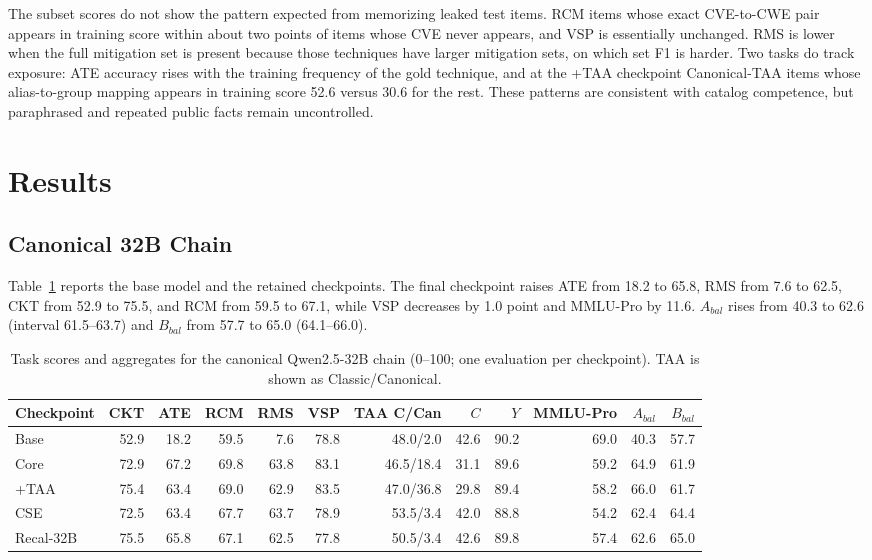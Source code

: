 \documentclass[conference]{IEEEtran}
\begin{document}
The subset scores do not show the pattern expected from memorizing leaked test items. RCM items whose exact CVE-to-CWE pair appears in training score within about two points of items whose CVE never appears, and VSP is essentially unchanged. RMS is lower when the full mitigation set is present because those techniques have larger mitigation sets, on which set F1 is harder. Two tasks do track exposure: ATE accuracy rises with the training frequency of the gold technique, and at the +TAA checkpoint Canonical-TAA items whose alias-to-group mapping appears in training score 52.6 versus 30.6 for the rest. These patterns are consistent with catalog competence, but paraphrased and repeated public facts remain uncontrolled.

\section{Results}\label{sec:results}
\subsection{Canonical 32B Chain}
Table~\ref{tab:mainresults} reports the base model and the retained checkpoints. The final checkpoint raises ATE from 18.2 to 65.8, RMS from 7.6 to 62.5, CKT from 52.9 to 75.5, and RCM from 59.5 to 67.1, while VSP decreases by 1.0 point and MMLU-Pro by 11.6. $A_{bal}$ rises from 40.3 to 62.6 (interval 61.5--63.7) and $B_{bal}$ from 57.7 to 65.0 (64.1--66.0).

\begin{table}[t]
\caption{Task scores and aggregates for the canonical Qwen2.5-32B chain (0--100; one evaluation per checkpoint). TAA is shown as Classic/Canonical.}
\label{tab:mainresults}
\centering
\scriptsize
\setlength{\tabcolsep}{3.0pt}
\begin{tabular}{@{}lrrrrrrrrrrr@{}}
\toprule
Checkpoint & CKT & ATE & RCM & RMS & VSP & TAA C/Can & $C$ & $Y$ & MMLU-Pro & $A_{bal}$ & $B_{bal}$ \\
\midrule
Base & 52.9 & 18.2 & 59.5 & 7.6 & 78.8 & 48.0/2.0 & 42.6 & 90.2 & 69.0 & 40.3 & 57.7 \\
Core & 72.9 & 67.2 & 69.8 & 63.8 & 83.1 & 46.5/18.4 & 31.1 & 89.6 & 59.2 & 64.9 & 61.9 \\
+TAA & 75.4 & 63.4 & 69.0 & 62.9 & 83.5 & 47.0/36.8 & 29.8 & 89.4 & 58.2 & 66.0 & 61.7 \\
CSE & 72.5 & 63.4 & 67.7 & 63.7 & 78.9 & 53.5/3.4 & 42.0 & 88.8 & 54.2 & 62.4 & 64.4 \\
Recal-32B & 75.5 & 65.8 & 67.1 & 62.5 & 77.8 & 50.5/3.4 & 42.6 & 89.8 & 57.4 & 62.6 & 65.0 \\
\bottomrule
\end{tabular}
\end{table}
\end{document}
